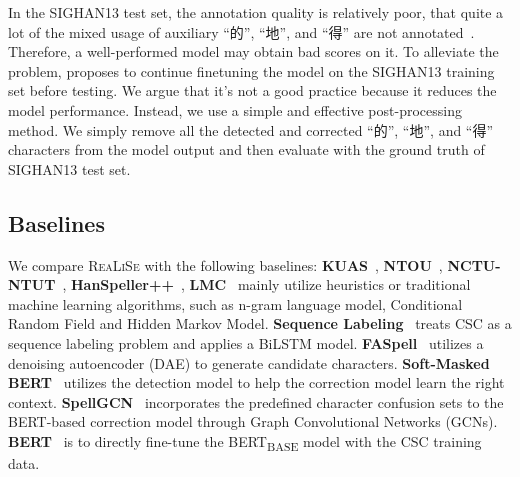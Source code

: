 \documentclass[11pt,a4paper]{article}
\newcommand\model{\textsc{ReaLiSe}}
\begin{document}
\begin{CJK*}{UTF8}{gbsn}
In the SIGHAN13 test set, the  annotation quality is relatively poor, that quite a lot of the mixed usage of auxiliary ``的'', ``地'', and ``得'' are not annotated~\citep{spellgcn}. Therefore, a well-performed model may obtain bad scores on it. To alleviate the problem, \citet{spellgcn} proposes to continue finetuning the model on the SIGHAN13 training set before testing. We argue that it's not a good practice because it reduces the model performance. Instead, we use a simple and effective post-processing method. We simply remove all the detected and corrected ``的'', ``地'', and ``得'' characters from the model output and then evaluate with the ground truth of SIGHAN13 test set. 


\end{CJK*}






\subsection{Baselines}

We compare \model{} with the following baselines: \textbf{KUAS}~\citep{kuas}, \textbf{NTOU}~\citep{ntou}, \textbf{NCTU-NTUT}~\citep{nctu}, \textbf{HanSpeller++}~\citep{HANSpeller++},  \textbf{LMC}~\citep{lmc} mainly utilize heuristics or traditional machine learning algorithms, such as n-gram language model, Conditional Random Field and Hidden Markov Model. \textbf{Sequence Labeling}~\citep{spell-corpus} treats CSC as a sequence labeling problem and applies a BiLSTM model. \textbf{FASpell}~\citep{FASPell} utilizes a denoising autoencoder (DAE) to generate candidate characters.
\textbf{Soft-Masked BERT}~\citep{softmask-spell} utilizes the detection model to help the correction model learn the right context.
\textbf{SpellGCN}~\citep{spellgcn} incorporates the predefined character confusion sets to the BERT-based correction model through Graph Convolutional Networks (GCNs). 
\textbf{BERT}~\citep{bert} is to directly fine-tune the BERT\textsubscript{BASE} model with the CSC training data.
\end{document}
